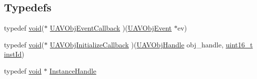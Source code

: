 \subsection*{Typedefs}
\begin{DoxyCompactItemize}
\item 
typedef \hyperlink{group___n_a_m_e_ga18028b8badbf1ea7e704ccac3c488e82}{void}($\ast$ \hyperlink{group___u_a_v_ga33d11560e38b56dc904220fb0f785c28}{U\-A\-V\-Obj\-Event\-Callback} )(\hyperlink{struct_u_a_v_obj_event}{U\-A\-V\-Obj\-Event} $\ast$ev)
\item 
typedef \hyperlink{group___n_a_m_e_ga18028b8badbf1ea7e704ccac3c488e82}{void}($\ast$ \hyperlink{group___u_a_v_ga16def10911b9b7e8626c2d1e3fec6e67}{U\-A\-V\-Obj\-Initialize\-Callback} )(\hyperlink{group___n_a_m_e_gac31715ab50a1903838e7d87c8022ec75}{U\-A\-V\-Obj\-Handle} obj\-\_\-handle, \hyperlink{stdint_8h_a273cf69d639a59973b6019625df33e30}{uint16\-\_\-t} \hyperlink{group___n_a_m_e_ga874457c6d2526c90ec75fa5a37d687ca}{inst\-Id})
\item 
typedef \hyperlink{group___n_a_m_e_ga18028b8badbf1ea7e704ccac3c488e82}{void} $\ast$ \hyperlink{group___u_a_v_gabd5387dedf4d32f408b532b19fcdc1da}{Instance\-Handle}
\end{DoxyCompactItemize}
